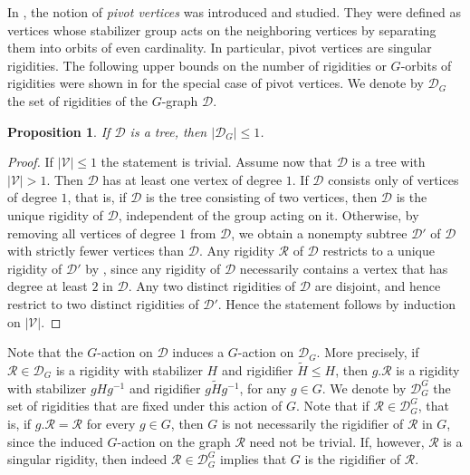 \documentclass[a4paper,12pt,reqno]{amsart}
\newcommand\mc\mathcal
\newtheorem{prop}[thm]{Proposition}
\theoremstyle{definition}
\numberwithin{equation}{thm}
\renewcommand{\leq}{\leqslant}
\begin{document}
In \cite{BG24}, the notion of \textit{pivot vertices} was introduced and studied. They were defined as vertices whose stabilizer group acts on the neighboring vertices by separating them into orbits of even cardinality.  In particular, pivot vertices are singular rigidities. The following upper bounds on the number of rigidities or $G$-orbits of rigidities were shown in \cite{BG24} for the special case of pivot vertices. We denote by $\mathcal{D}_G$ the set of rigidities of the $G$-graph $\mc{D}$.
\begin{prop}\label{pivots in trees}
If $\mc{D}$ is a tree, then $|\mc{D}_G| \leq 1$.
\end{prop}
\begin{proof}
If $|\mc{V}|\leq 1$ the statement is trivial.
Assume now that $\mc{D}$ is a tree with $|\mc{V}| > 1$. 
Then $\mc{D}$ has at least one vertex of degree $1$.
If $\mc{D}$ consists only of vertices of degree $1$, that is, if $\mc{D}$ is the tree consisting of two vertices, then %
$\mathcal{D}$ is the unique rigidity of $\mathcal{D}$, independent of the group acting on it.
Otherwise, by removing all vertices of degree $1$ from $\mc{D}$, we obtain a nonempty subtree $\mc{D}'$ of $\mc D$ with strictly fewer vertices than $\mc{D}$. Any rigidity $\mathcal{R}$ of $\mc{D}$ restricts to a unique rigidity of $\mc{D}'$ by , since any rigidity of $\mathcal{D}$ necessarily contains a vertex that has degree at least $2$ in $\mathcal{D}$. Any two distinct rigidities of $\mc{D}$ are disjoint, and hence restrict to two distinct rigidities of $\mc{D}'$.
Hence the statement follows by induction on $|\mc{V}|$.
\end{proof}

Note that the $G$-action on $\mc{D}$ induces a $G$-action on $\mathcal{D}_G$. More precisely, if $\mc{R} \in \mc{D}_G$ is a rigidity with stabilizer $H$ and rigidifier $\widetilde{H} \leq H$, then $g.\mc{R}$ is a rigidity with stabilizer $gHg^{-1}$ and rigidifier $g\widetilde{H}g^{-1}$,  for any $g\in G$. We denote by $\mathcal{D}_G^G$ the set of rigidities that are fixed under this action of $G$. Note that if $\mc{R} \in \mathcal{D}_G^G$, that is, if $g.\mc{R}=\mc{R}$ for every $g\in G$, then $G$ is not necessarily the rigidifier of $\mc{R}$ in $G$, since the induced $G$-action on the graph $\mc{R}$ need not be trivial. If, however, $\mc{R}$ is a singular rigidity, then indeed $\mc{R} \in \mathcal{D}_G^G$ implies that $G$ is the rigidifier of $\mc{R}$.
\end{document}
